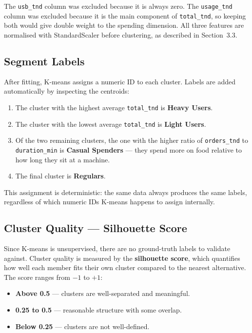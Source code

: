 The \texttt{usb\_tnd} column was excluded because it is always zero. The
\texttt{usage\_tnd} column was excluded because it is the main component of
\texttt{total\_tnd}, so keeping both would give double weight to the spending dimension.
All three features are normalised with StandardScaler before clustering, as described
in Section~3.3.

\subsection{Segment Labels}

After fitting, K-means assigns a numeric ID to each cluster. Labels are added
automatically by inspecting the centroids:

\begin{enumerate}
  \item The cluster with the highest average \texttt{total\_tnd} is
        \textbf{Heavy Users}.
  \item The cluster with the lowest average \texttt{total\_tnd} is
        \textbf{Light Users}.
  \item Of the two remaining clusters, the one with the higher ratio of
        \texttt{orders\_tnd} to \texttt{duration\_min} is \textbf{Casual Spenders} ---
        they spend more on food relative to how long they sit at a machine.
  \item The final cluster is \textbf{Regulars}.
\end{enumerate}

This assignment is deterministic: the same data always produces the same labels,
regardless of which numeric IDs K-means happens to assign internally.

\subsection{Cluster Quality --- Silhouette Score}

Since K-means is unsupervised, there are no ground-truth labels to validate against.
Cluster quality is measured by the \textbf{silhouette score}, which quantifies how
well each member fits their own cluster compared to the nearest alternative. The
score ranges from $-1$ to $+1$:

\begin{itemize}[noitemsep]
  \item \textbf{Above 0.5} --- clusters are well-separated and meaningful.
  \item \textbf{0.25 to 0.5} --- reasonable structure with some overlap.
  \item \textbf{Below 0.25} --- clusters are not well-defined.
\end{itemize}

